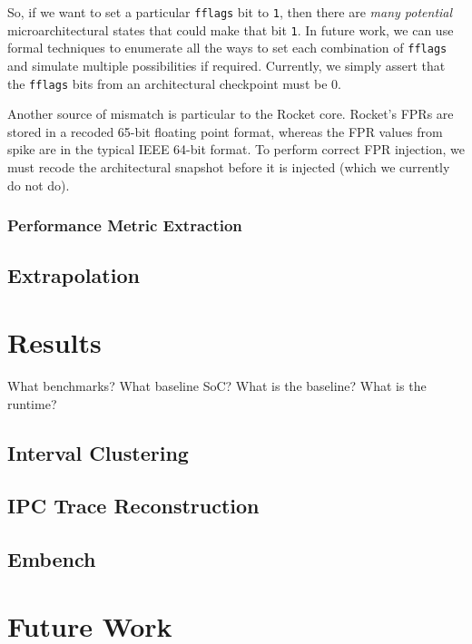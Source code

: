 \documentclass[sigplan,nonacm,10pt]{acmart}
\begin{document}
So, if we want to set a particular \texttt{fflags} bit to \texttt{1}, then there are \textit{many potential} microarchitectural states that could make that bit \texttt{1}.
In future work, we can use formal techniques to enumerate all the ways to set each combination of \texttt{fflags} and simulate multiple possibilities if required.
Currently, we simply assert that the \texttt{fflags} bits from an architectural checkpoint must be 0.

Another source of mismatch is particular to the Rocket core.
Rocket's FPRs are stored in a recoded 65-bit floating point format, whereas the FPR values from spike are in the typical IEEE 64-bit format.
To perform correct FPR injection, we must recode the architectural snapshot before it is injected (which we currently do not do).

\subsubsection{Performance Metric Extraction}



\subsection{Extrapolation}

\section{Results}

What benchmarks?
What baseline SoC?
What is the baseline?
What is the runtime?

\subsection{Interval Clustering}

\subsection{IPC Trace Reconstruction}

\subsection{Embench}

\section{Future Work}
\end{document}

